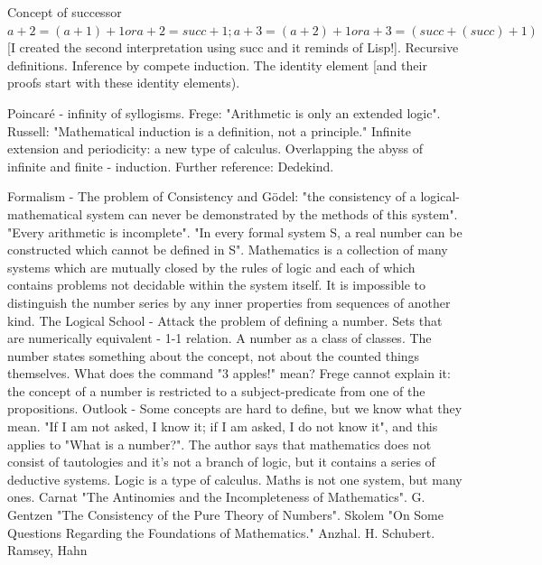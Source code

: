 \documentclass{cornell}
\begin{document}
%
{ Concept of successor \( a+2 = (a+1) +1 or a+2 = succ +1 ; a+3=(a+2)+1 or a+3=(succ+(succ)+1) \) [I created the second interpretation using succ and it reminds of Lisp!]. Recursive definitions. Inference by compete induction. The identity element [and their proofs start with these identity elements). }%

%
{Poincaré - infinity of syllogisms. Frege: "Arithmetic is only an extended logic". Russell: "Mathematical induction is a definition, not a principle." Infinite extension and periodicity: a new type of calculus. Overlapping the abyss of infinite and finite - induction. }%
{Further reference: Dedekind. }%

%
{Formalism - The problem of Consistency and Gödel: "the consistency of a logical-mathematical system can never be demonstrated by the methods of this system". "Every arithmetic is incomplete". "In every formal system S, a real number can be constructed which cannot be defined in S". Mathematics is a collection of many systems which are mutually closed by the rules of logic and each of which contains problems not decidable within the system itself. It is impossible to distinguish the number series by any inner properties from sequences of another kind.}%
{The Logical School - Attack the problem of defining a number. Sets that are numerically equivalent - 1-1 relation. A number as a class of classes. The number states something about the concept, not about the counted things themselves. What does the command "3 apples!" mean? Frege cannot explain it: the concept of a number is restricted to a subject-predicate from one of the propositions. }%
{Outlook - Some concepts are hard to define, but we know what they mean. "If I am not asked, I know it; if I am asked, I do not know it", and this applies to "What is a number?". The author says that mathematics does not consist of tautologies and it's not a branch of logic, but it contains a series of deductive systems. Logic is a type of calculus. Maths is not one system, but many ones.  }%
{Carnat "The Antinomies and the Incompleteness of Mathematics". G. Gentzen "The Consistency of the Pure Theory of Numbers". Skolem "On Some Questions Regarding the Foundations of Mathematics." Anzhal. H. Schubert. Ramsey, Hahn}%
\end{document}
